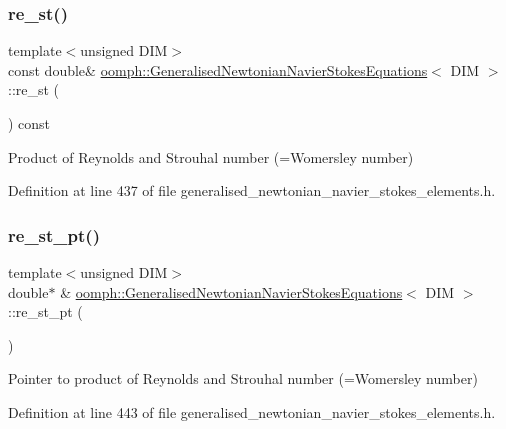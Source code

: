 \subsubsection{\texorpdfstring{re\+\_\+st()}{re\_st()}}
{\footnotesize\ttfamily template$<$unsigned D\+IM$>$ \\
const double\& \hyperlink{classoomph_1_1GeneralisedNewtonianNavierStokesEquations}{oomph\+::\+Generalised\+Newtonian\+Navier\+Stokes\+Equations}$<$ D\+IM $>$\+::re\+\_\+st (\begin{DoxyParamCaption}{ }\end{DoxyParamCaption}) const\hspace{0.3cm}{\ttfamily [inline]}}



Product of Reynolds and Strouhal number (=Womersley number) 



Definition at line 437 of file generalised\+\_\+newtonian\+\_\+navier\+\_\+stokes\+\_\+elements.\+h.

\mbox{\label{classoomph_1_1GeneralisedNewtonianNavierStokesEquations_aefecd5aff65184ed54fca9c45e0b27ba}} 
\subsubsection{\texorpdfstring{re\+\_\+st\+\_\+pt()}{re\_st\_pt()}}
{\footnotesize\ttfamily template$<$unsigned D\+IM$>$ \\
double$\ast$ \& \hyperlink{classoomph_1_1GeneralisedNewtonianNavierStokesEquations}{oomph\+::\+Generalised\+Newtonian\+Navier\+Stokes\+Equations}$<$ D\+IM $>$\+::re\+\_\+st\+\_\+pt (\begin{DoxyParamCaption}{ }\end{DoxyParamCaption})\hspace{0.3cm}{\ttfamily [inline]}}



Pointer to product of Reynolds and Strouhal number (=Womersley number) 



Definition at line 443 of file generalised\+\_\+newtonian\+\_\+navier\+\_\+stokes\+\_\+elements.\+h.



